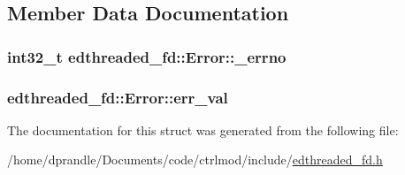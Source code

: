 \subsection{Member Data Documentation}
\hypertarget{structedthreaded__fd_1_1Error_a41ad28fb17556cff7060fc6eb7bbab75}{
\subsubsection[{\-\_\-errno}]{\setlength{\rightskip}{0pt plus 5cm}int32\-\_\-t edthreaded\-\_\-fd\-::\-Error\-::\-\_\-errno}}\label{structedthreaded__fd_1_1Error_a41ad28fb17556cff7060fc6eb7bbab75}
\hypertarget{structedthreaded__fd_1_1Error_acc3972f4951454b71a97e3ede3dccb40}{
\subsubsection[{err\-\_\-val}]{ edthreaded\-\_\-fd\-::\-Error\-::err\-\_\-val}}\label{structedthreaded__fd_1_1Error_acc3972f4951454b71a97e3ede3dccb40}


The documentation for this struct was generated from the following file\-:\begin{DoxyCompactItemize}
\item 
/home/dprandle/\-Documents/code/ctrlmod/include/\hyperlink{edthreaded__fd_8h}{edthreaded\-\_\-fd.\-h}\end{DoxyCompactItemize}
